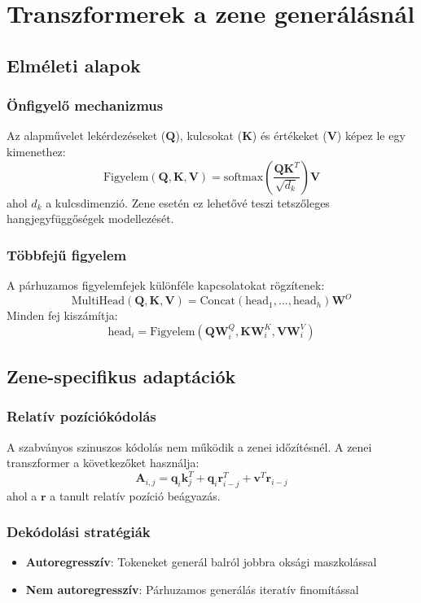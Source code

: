 \chapter{Transzformerek a zene generálásnál}
\label{chap:transformers}

\section{Elméleti alapok}
\subsection{Önfigyelő mechanizmus}
Az alapművelet lekérdezéseket ($\mathbf{Q}$), kulcsokat ($\mathbf{K}$) és értékeket ($\mathbf{V}$) képez le egy kimenethez:
\[
\text{Figyelem}(\mathbf{Q},\mathbf{K},\mathbf{V}) = \text{softmax}\left(\frac{\mathbf{Q}\mathbf{K}^T}{\sqrt{d_k}}\right)\mathbf{V}
\]
ahol $d_k$ a kulcsdimenzió. Zene esetén ez lehetővé teszi tetszőleges hangjegyfüggőségek modellezését.

\subsection{Többfejű figyelem}
A párhuzamos figyelemfejek különféle kapcsolatokat rögzítenek:
\[
\text{MultiHead}(\mathbf{Q},\mathbf{K},\mathbf{V}) = \text{Concat}(\text{head}_1,...,\text{head}_h)\mathbf{W}^O
\]
Minden fej kiszámítja:
\[
\text{head}_i = \text{Figyelem}(\mathbf{Q}\mathbf{W}_i^Q, \mathbf{K}\mathbf{W}_i^K, \mathbf{V}\mathbf{W}_i^V)
\]

\section{Zene-specifikus adaptációk}
\subsection{Relatív pozíciókódolás}
A szabványos szinuszos kódolás nem működik a zenei időzítésnél. A zenei transzformer \cite{huang2018music} a következőket használja:
\[
\mathbf{A}_{i,j} = \mathbf{q}_i \mathbf{k}_j^T + \mathbf{q}_i \mathbf{r}_{i-j}^T + \mathbf{v}^T \mathbf{r}_{i-j}
\]
ahol a $\mathbf{r}$ a tanult relatív pozíció beágyazás.

\subsection{Dekódolási stratégiák}
\begin{itemize}
    \item \textbf{Autoregresszív}: Tokeneket generál balról jobbra oksági maszkolással
    \item \textbf{Nem autoregresszív}: Párhuzamos generálás iteratív finomítással
\end{itemize}

